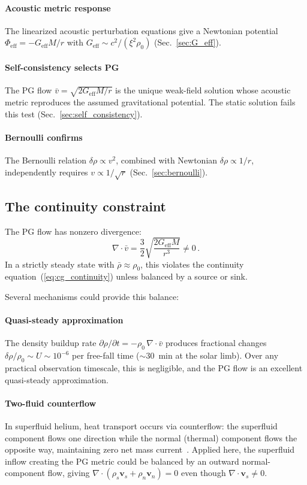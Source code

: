 \documentclass[12pt, a4paper]{article}
\newcommand{\Geff}{G_{\mathrm{eff}}}
\newcommand{\rhob}{\bar{\rho}}
\newcommand{\vb}{\bar{v}}
\newcommand{\Phieff}{\Phi_{\mathrm{eff}}}
\begin{document}
\paragraph{Acoustic metric response} The linearized acoustic perturbation equations give a Newtonian potential $\Phieff = -\Geff M/r$ with $\Geff \sim c^2/(\xi^2\rho_0)$ (Sec.~\ref{sec:G_eff}).

\paragraph{Self-consistency selects PG} The PG flow $\vb = \sqrt{2\Geff M/r}$ is the unique weak-field solution whose acoustic metric reproduces the assumed gravitational potential. The static solution fails this test (Sec.~\ref{sec:self_consistency}).

\paragraph{Bernoulli confirms} The Bernoulli relation $\delta\rho \propto v^2$, combined with Newtonian $\delta\rho \propto 1/r$, independently requires $v \propto 1/\sqrt{r}$ (Sec.~\ref{sec:bernoulli}).


\subsection{The continuity constraint}
\label{sec:continuity}

The PG flow has nonzero divergence:
\begin{equation}
    \nabla\cdot\vb = \frac{3}{2}\sqrt{\frac{2\Geff M}{r^3}} \neq 0\,.
\end{equation}
In a strictly steady state with $\rhob \approx \rho_0$, this violates the continuity equation~(\ref{eq:cg_continuity}) unless balanced by a source or sink.

Several mechanisms could provide this balance:

\paragraph{Quasi-steady approximation} The density buildup rate $\partial\rho/\partial t = -\rho_0\,\nabla\cdot\vb$ produces fractional changes $\delta\rho/\rho_0 \sim U \sim 10^{-6}$ per free-fall time ($\sim 30$~min at the solar limb). Over any practical observation timescale, this is negligible, and the PG flow is an excellent quasi-steady approximation.

\paragraph{Two-fluid counterflow} In superfluid helium, heat transport occurs via counterflow: the superfluid component flows one direction while the normal (thermal) component flows the opposite way, maintaining zero net mass current~\cite{volovik_2003}. Applied here, the superfluid inflow creating the PG metric could be balanced by an outward normal-component flow, giving $\nabla\cdot(\rho_s \mathbf{v}_s + \rho_n\mathbf{v}_n) = 0$ even though $\nabla\cdot\mathbf{v}_s \neq 0$.
\end{document}
